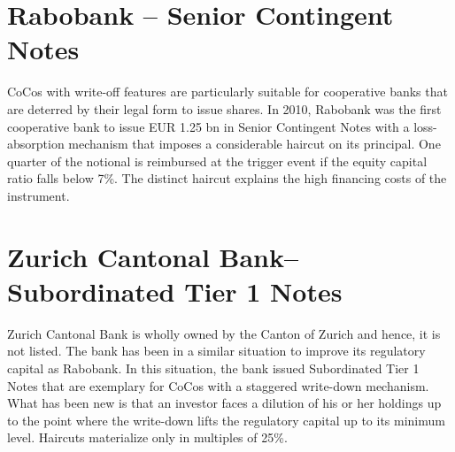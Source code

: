 \section{Rabobank -- Senior Contingent Notes}
CoCos with write-off features are particularly suitable for cooperative banks that are deterred by their legal form to issue shares. In 2010, Rabobank was the first cooperative bank to issue EUR 1.25 bn in Senior Contingent Notes with a loss-absorption mechanism that imposes a considerable haircut on its principal. One quarter of the notional is reimbursed at the trigger event if the equity capital ratio falls below 7\%. The distinct haircut explains the high financing costs of the instrument. 
\citep{rabobank2010}


\section{Zurich Cantonal Bank-- Subordinated Tier 1 Notes}
Zurich Cantonal Bank is wholly owned by the Canton of Zurich and hence, it is not listed. The bank has been in a similar situation to improve its regulatory capital as Rabobank. In this situation, the bank issued Subordinated Tier 1 Notes that are exemplary for CoCos with a staggered write-down mechanism. What has been new is that an investor faces a dilution of his or her holdings up to the point where the write-down lifts the regulatory capital up to its minimum level. Haircuts materialize only in multiples of 25\%.  \citet{zkv2013}


